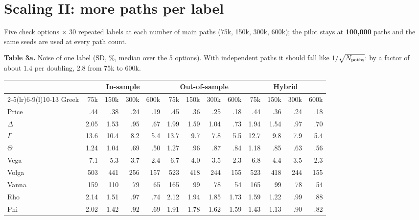 \documentclass[10pt,letterpaper]{article}
\begin{document}
\section*{Scaling II: more paths per label}
Five check options $\times$ 30 repeated labels at each number of main paths (75k, 150k, 300k, 600k);
the pilot stays at \textbf{100,000} paths and the same seeds are used at every path count.

\textbf{Table 3a.} Noise of one label (SD, \%, median over the 5 options). With independent paths it
should fall like $1/\sqrt{N_{\rm paths}}$: by a factor of about $1.4$ per doubling, $2.8$ from 75k to 600k.
\begin{center}
\fontsize{7.9}{9.2}\selectfont
\setlength{\tabcolsep}{3.3pt}
\begin{tabular}{@{}lrrrrrrrrrrrr@{}}
\toprule
& \multicolumn{4}{c}{In-sample} & \multicolumn{4}{c}{Out-of-sample} & \multicolumn{4}{c}{Hybrid}\\
\cmidrule(lr){2-5}\cmidrule(lr){6-9}\cmidrule(l){10-13}
Greek & 75k & 150k & 300k & 600k & 75k & 150k & 300k & 600k & 75k & 150k & 300k & 600k\\
\midrule
Price & .44 & .38 & .24 & .19 & .45 & .36 & .25 & .18 & .44 & .36 & .24 & .18 \\
$\Delta$ & 2.05 & 1.53 & .95 & .67 & 1.99 & 1.59 & 1.04 & .73 & 1.94 & 1.54 & .97 & .70 \\
$\Gamma$ & 13.6 & 10.4 & 8.2 & 5.4 & 13.7 & 9.7 & 7.8 & 5.5 & 12.7 & 9.8 & 7.9 & 5.4 \\
$\Theta$ & 1.24 & 1.04 & .69 & .50 & 1.27 & .96 & .87 & .84 & 1.18 & .85 & .63 & .56 \\
Vega & 7.1 & 5.3 & 3.7 & 2.4 & 6.7 & 4.0 & 3.5 & 2.3 & 6.8 & 4.4 & 3.5 & 2.3 \\
Volga & 503 & 441 & 256 & 157 & 523 & 418 & 244 & 155 & 523 & 418 & 244 & 155 \\
Vanna & 159 & 110 & 79 & 65 & 165 & 99 & 78 & 54 & 165 & 99 & 78 & 54 \\
Rho & 2.14 & 1.51 & .97 & .74 & 2.12 & 1.94 & 1.85 & 1.73 & 1.59 & 1.22 & .99 & .88 \\
Phi & 2.02 & 1.42 & .92 & .69 & 1.91 & 1.78 & 1.62 & 1.59 & 1.43 & 1.13 & .90 & .82 \\
\bottomrule
\end{tabular}
\end{center}
\end{document}
